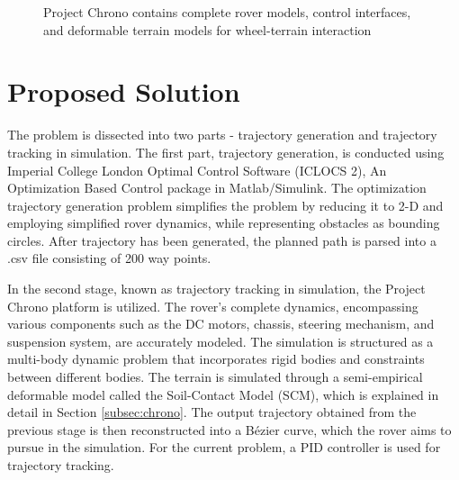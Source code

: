 \documentclass{article}
\begin{document}
\begin{figure}
	\centering     %
	\caption{Project Chrono contains complete rover models, control interfaces, and deformable terrain models for wheel-terrain interaction}
\end{figure}


\section{Proposed Solution}

The problem is dissected into two parts - trajectory generation and trajectory tracking in simulation. The first part, trajectory generation, is conducted using Imperial College London Optimal Control Software (ICLOCS 2), An Optimization Based Control package in Matlab/Simulink. The optimization trajectory generation problem simplifies the problem by reducing it to 2-D and employing simplified rover dynamics, while representing obstacles as bounding circles. After trajectory has been generated, the planned path is parsed into a .csv file consisting of 200 way points. 

In the second stage, known as trajectory tracking in simulation, the Project Chrono platform is utilized. The rover's complete dynamics, encompassing various components such as the DC motors, chassis, steering mechanism, and suspension system, are accurately modeled. The simulation is structured as a multi-body dynamic problem that incorporates rigid bodies and constraints between different bodies. The terrain is simulated through a semi-empirical deformable model called the Soil-Contact Model (SCM), which is explained in detail in Section \ref{subsec:chrono}. The output trajectory obtained from the previous stage is then reconstructed into a Bézier curve, which the rover aims to pursue in the simulation. For the current problem, a PID controller is used for trajectory tracking.
\end{document}

